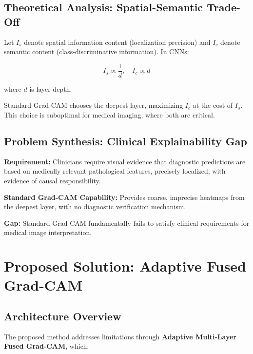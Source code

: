 \documentclass[12pt,a4paper,oneside]{book}
\begin{document}
\section{Theoretical Analysis: Spatial-Semantic Trade-Off}

Let $I_s$ denote spatial information content (localization precision) and $I_c$ denote semantic content (class-discriminative information). In CNNs:

\begin{equation}
I_s \propto \frac{1}{d}, \quad I_c \propto d
\label{eq:tradeoff}
\end{equation}

where $d$ is layer depth.

Standard Grad-CAM chooses the deepest layer, maximizing $I_c$ at the cost of $I_s$. This choice is suboptimal for medical imaging, where both are critical.

\section{Problem Synthesis: Clinical Explainability Gap}

\textbf{Requirement:} Clinicians require visual evidence that diagnostic predictions are based on medically relevant pathological features, precisely localized, with evidence of causal responsibility.

\textbf{Standard Grad-CAM Capability:} Provides coarse, imprecise heatmaps from the deepest layer, with no diagnostic verification mechanism.

\textbf{Gap:} Standard Grad-CAM fundamentally fails to satisfy clinical requirements for medical image interpretation.

\chapter{Proposed Solution: Adaptive Fused Grad-CAM}
\label{ch:solution}

\section{Architecture Overview}

The proposed method addresses limitations through \textbf{Adaptive Multi-Layer Fused Grad-CAM}, which:
\end{document}
